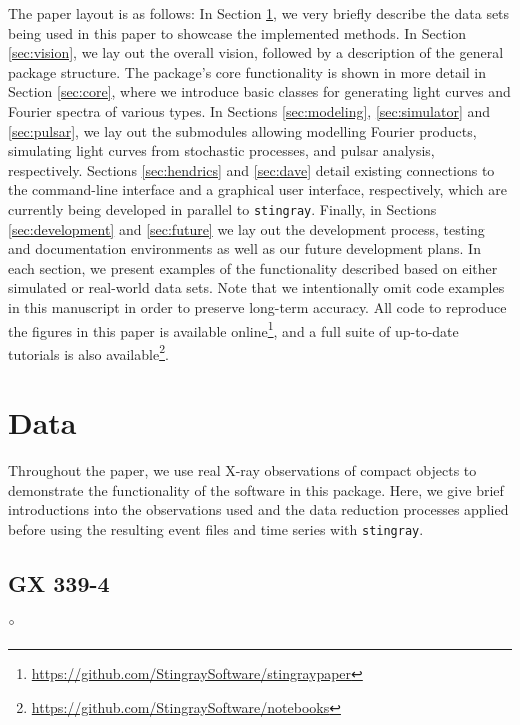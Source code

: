\documentclass[twocolumn]{aastex62}
\newcommand{\stingray}{\texttt{stingray}\xspace}
\begin{document}
The paper layout is as follows: 
In Section \ref{sec:data}, we very briefly describe the data sets being used in this paper to showcase the implemented methods. In Section \ref{sec:vision}, we lay out the overall vision, followed by a description of the general package structure. The package's core functionality is shown in more detail in Section \ref{sec:core}, where we introduce basic classes for generating light curves and Fourier spectra of various types.
In Sections \ref{sec:modeling}, \ref{sec:simulator} and \ref{sec:pulsar}, we lay out the submodules allowing modelling Fourier products, simulating light curves from stochastic processes, and pulsar analysis, respectively.
Sections \ref{sec:hendrics} and \ref{sec:dave} detail existing connections to the command-line interface and a graphical user interface, respectively, which are currently being developed in parallel to \stingray. 
Finally, in Sections \ref{sec:development} and \ref{sec:future} we lay out the development process, testing and documentation environments as well as our future development plans. 
In each section, we present examples of the functionality described based on either simulated or real-world data sets. Note that we intentionally omit code examples in this manuscript in order to preserve long-term accuracy. All code to reproduce the figures in this paper is available online\footnote{\url{https://github.com/StingraySoftware/stingraypaper}}, and a full suite of up-to-date tutorials is also available\footnote{\url{https://github.com/StingraySoftware/notebooks}}.

\section{Data}
\label{sec:data}
Throughout the paper, we use real X-ray observations of compact objects to demonstrate the functionality of the software in this package. Here, we give brief introductions into the observations used and the data reduction processes applied before using the resulting event files and time series with \stingray.

\subsection{GX 339-4}
\label{sec:gx339}
$\degree$
\end{document}
